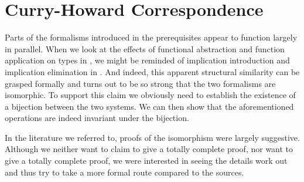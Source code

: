 \chapter{Curry-Howard Correspondence}

Parts of the formalisms introduced in the prerequisites appear to function
largely in parallel. When we look at the effects of functional abstraction and
function application on types in \stlambda, we might be reminded of implication
introduction and implication elimination in \implnpi. And indeed, this apparent
structural similarity can be grasped formally and turns out to be so strong that
the two formalisms are isomorphic. To support this claim we obviously need to
establish the existence of a bijection between the two systems. We can then show
that the aforementioned operations are indeed invariant under the bijection.

In the literature we referred to, proofs of the isomorphism were largely
suggestive. Although we neither want to claim to give a totally complete proof,
nor want to give a totally complete proof, we were interested in seeing the
details work out and thus try to take a more formal route compared to the
sources.






